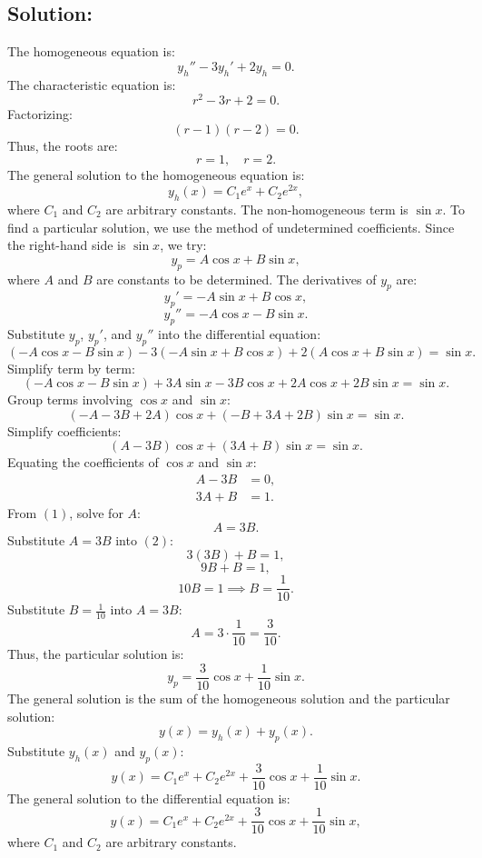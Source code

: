 \documentclass[12pt]{article}
\begin{document}
    \subsection*{Solution:}
        The homogeneous equation is:
        \[
        y_h'' - 3y_h' + 2y_h = 0.
        \]
        The characteristic equation is:
        \[
        r^2 - 3r + 2 = 0.
        \]
        Factorizing:
        \[
        (r - 1)(r - 2) = 0.
        \]
        Thus, the roots are:
        \[
        r = 1, \quad r = 2.
        \]
        The general solution to the homogeneous equation is:
        \[
        y_h(x) = C_1 e^x + C_2 e^{2x},
        \]
        where \(C_1\) and \(C_2\) are arbitrary constants.
        The non-homogeneous term is \(\sin x\). To find a particular solution, we use the method of undetermined coefficients. Since the right-hand side is \(\sin x\), we try:
        \[
        y_p = A \cos x + B \sin x,
        \]
        where \(A\) and \(B\) are constants to be determined.
        The derivatives of \(y_p\) are:
        \[
        y_p' = -A \sin x + B \cos x,
        \]
        \[
        y_p'' = -A \cos x - B \sin x.
        \]
        Substitute \(y_p\), \(y_p'\), and \(y_p''\) into the differential equation:
        \[
        (-A \cos x - B \sin x) - 3(-A \sin x + B \cos x) + 2(A \cos x + B \sin x) = \sin x.
        \]
        Simplify term by term:
        \[
        (-A \cos x - B \sin x) + 3A \sin x - 3B \cos x + 2A \cos x + 2B \sin x = \sin x.
        \]
        Group terms involving \(\cos x\) and \(\sin x\):
        \[
        (-A - 3B + 2A)\cos x + (-B + 3A + 2B)\sin x = \sin x.
        \]
        Simplify coefficients:
        \[
        (A - 3B)\cos x + (3A + B)\sin x = \sin x.
        \]
        Equating the coefficients of \(\cos x\) and \(\sin x\):
        \begin{align*}
        A - 3B &= 0, \tag{1} \\
        3A + B &= 1. \tag{2}
        \end{align*}
        From \((1)\), solve for \(A\):
        \[
        A = 3B.
        \]
        Substitute \(A = 3B\) into \((2)\):
        \[
        3(3B) + B = 1,
        \]
        \[
        9B + B = 1,
        \]
        \[
        10B = 1 \implies B = \frac{1}{10}.
        \]
        Substitute \(B = \frac{1}{10}\) into \(A = 3B\):
        \[
        A = 3 \cdot \frac{1}{10} = \frac{3}{10}.
        \]
        Thus, the particular solution is:
        \[
        y_p = \frac{3}{10} \cos x + \frac{1}{10} \sin x.
        \]
        The general solution is the sum of the homogeneous solution and the particular solution:
        \[
        y(x) = y_h(x) + y_p(x).
        \]
        Substitute \(y_h(x)\) and \(y_p(x)\):
        \[
        y(x) = C_1 e^x + C_2 e^{2x} + \frac{3}{10} \cos x + \frac{1}{10} \sin x.
        \]
        The general solution to the differential equation is:
        \[
        y(x) = C_1 e^x + C_2 e^{2x} + \frac{3}{10} \cos x + \frac{1}{10} \sin x,
        \]
        where \(C_1\) and \(C_2\) are arbitrary constants.
    
\end{document}
